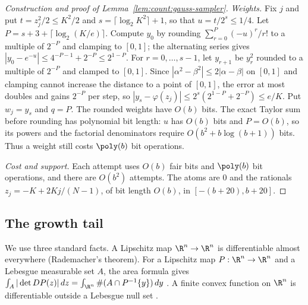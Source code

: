 \begin{proof}[Construction and proof of Lemma~\ref{lem:count:gauss-sampler}]
\emph{Weights.} Fix $j$ and put $t=z_j^2/2\le K^2/2$ and
$s=\lceil\log_2K^2\rceil+1$, so that $u=t/2^s\le1/4$. Let $P=s+3+\lceil\log_2(K/e)\rceil$.
Compute $y_0$ by rounding $\sum_{r=0}^{P}(-u)^r/r!$ to a multiple of $2^{-P}$
and clamping to $[0,1]$; the alternating series gives
$|y_0-e^{-u}|\le4^{-P-1}+2^{-P}\le2^{1-P}$. For
$r=0,\dots,s-1$, let $y_{r+1}$ be $y_r^2$ rounded to a multiple of $2^{-P}$
and clamped to $[0,1]$. Since $|\alpha^2-\beta^2|\le2|\alpha-\beta|$ on $[0,1]$
and clamping cannot increase the distance to a point of $[0,1]$, the error at
most doubles and gains $2^{-P}$ per step, so
$|y_s-\varphi(z_j)|\le2^s(2^{1-P}+2^{-P})\le e/K$. Put $w_j=y_s$ and $q=P$.
The rounded weights have $O(b)$ bits. The exact Taylor sum before rounding
has polynomial bit length: $u$ has $O(b)$ bits and $P=O(b)$, so its powers
and the factorial denominators require $O(b^2+b\log(b+1))$ bits. Thus a
weight still costs $\poly(b)$ bit operations.

\emph{Cost and support.} Each attempt uses $O(b)$ fair bits and $\poly(b)$ bit
operations, and there are $O(b^2)$ attempts. The atoms are $0$ and the
rationals $z_j=-K+2Kj/(N-1)$, of bit length $O(b)$, in $[-(b+20),b+20]$.
\end{proof}

\subsection{The growth tail}

We use three standard facts. A Lipschitz map $\R^n\to\R^n$ is differentiable
almost everywhere (Rademacher's theorem). For a Lipschitz map
$P:\R^n\to\R^n$ and a Lebesgue measurable set $A$, the area formula gives
$\int_A|\det DP(z)|\,dz=\int_{\R^n}\#(A\cap P^{-1}\{y\})\,dy$
\cite{evans2015-measure-theory-and-fine,federer1969-geometric-measure-theory}.
A finite convex function on $\R^n$ is differentiable outside a Lebesgue null
set \cite{rockafellar1970-convex-analysis}.


